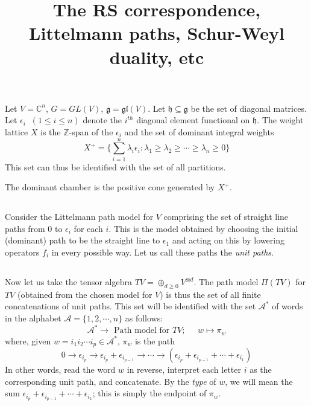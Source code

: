 \documentclass[reqno]{amsart}
\theoremstyle{definition}
\newcommand{\lieg}{\mathfrak{g}}
\newcommand{\lieh}{\mathfrak{h}}
\newcommand{\integers}{\mathbb{Z}}
\newcommand{\complex}{\mathbb{C}}
\begin{document}
\title{The RS correspondence, Littelmann paths, Schur-Weyl duality, etc}
\maketitle
\section{}
\subsection{}
Let $V =\complex^n$, $G = GL(V)$, $\lieg = \mathfrak{gl}(V)$. Let $\lieh \subseteq \lieg$ be the set of diagonal matrices. Let $\epsilon_i \;\;(1 \leq i \leq n)$ denote the $i^{th}$ diagonal element functional on $\lieh$. The weight lattice $X$ is the $\integers$-span of the $\epsilon_i$ and the set of dominant integral weights
\[X^+ = \{\sum_{i=1}^n \lambda_i \epsilon_i: \lambda_1 \geq \lambda_2 \geq \cdots \geq \lambda_n \geq 0\}\]
This set can thus be identified with the set of all partitions.

The dominant chamber is the positive cone generated by $X^+$.

\subsection{}
Consider the Littelmann path model for $V$ comprising the set of straight line paths from $0$ to $\epsilon_i$ for each $i$. This is the model obtained by choosing the initial (dominant) path to be the straight line to $\epsilon_1$ and acting on this by lowering operators $f_i$ in every possible way. Let us call these paths the {\em unit paths}.


\subsection{}
Now let us take the tensor algebra $TV = \oplus_{d \geq 0}V^{\otimes d}$. The path model $\Pi(TV)$ for $TV$ (obtained from the chosen model for $V$) is thus the set of all finite concatenations of unit paths. This set will be identified with the set $\mathcal{A}^*$ of words in the alphabet $\mathcal{A}=\{1, 2, \cdots, n\}$ as follows:
\[ \mathcal{A}^* \to \text{ Path model for } TV ; \;\;\;\;\; w \mapsto \pi_w\]
where, given $w = i_1i_2\cdots i_p \in \mathcal{A}^*$, $\pi_w$ is the path
\[0 \longrightarrow \epsilon_{i_p} \longrightarrow \epsilon_{i_p} + \epsilon_{i_{p-1}} \longrightarrow \cdots \longrightarrow (\epsilon_{i_p} + \epsilon_{i_{p-1}} + \cdots + \epsilon_{i_1})\]
In other words, read the word $w$ in reverse, interpret each letter $i$ as the corresponding unit path, and concatenate.
By the {\em type} of $w$, we will mean the sum $\epsilon_{i_p} + \epsilon_{i_{p-1}} + \cdots + \epsilon_{i_1}$; this is simply the endpoint of $\pi_w$.
\end{document}
